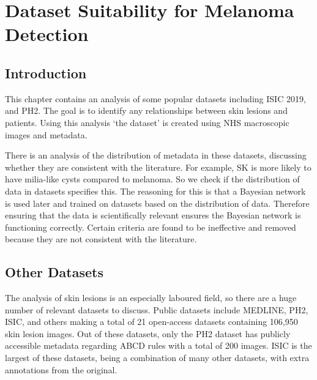 \chapter{Dataset Suitability for Melanoma Detection}

\section{Introduction}
This chapter contains an analysis of some popular datasets including ISIC 2019, and PH2. The goal is to identify any relationships between skin lesions and patients. Using this analysis `the dataset' is created using NHS macroscopic images and metadata.

There is an analysis of the distribution of metadata in these datasets, discussing whether they are consistent with the literature. For example, SK is more likely to have milia-like cysts compared to melanoma. So we check if the distribution of data in datasets specifies this. The reasoning for this is that a Bayesian network is used later and trained on datasets based on the distribution of data. Therefore ensuring that the data is scientifically relevant ensures the Bayesian network is functioning correctly. Certain criteria are found to be ineffective and removed because they are not consistent with the literature.

\section{Other Datasets}
The analysis of skin lesions is an especially laboured field, so there are a huge number of relevant datasets to discuss. Public datasets include MEDLINE, PH2, ISIC, and others making a total of 21 open-access datasets containing 106,950 skin lesion images\cite{Wen2022}. Out of these datasets, only the PH2 dataset has publicly accessible metadata regarding ABCD rules with a total of 200 images. ISIC is the largest of these datasets, being a combination of many other datasets, with extra annotations from the original.

